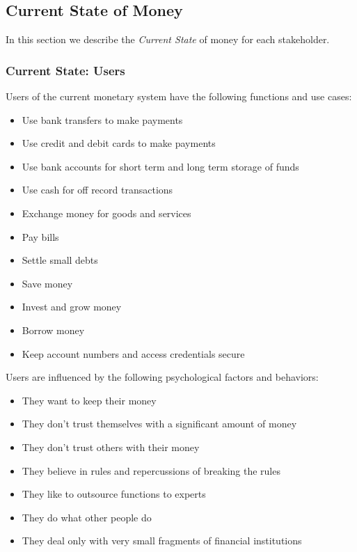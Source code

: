 \documentclass[a4paper,12pt]{article} %
\begin{document}
{\subsection{Current State of Money} \label{ssec:4.3}

In this section we describe the \textit{Current State} of money for each stakeholder.

\subsubsection{Current State: Users} \label{sssec:4.3:users}

Users of the current monetary system have the following functions and use cases:

\begin{itemize}
	\item Use bank transfers to make payments
	\item Use credit and debit cards to make payments
	\item Use bank accounts for short term and long term storage of funds
	\item Use cash for off record transactions
	\item Exchange money for goods and services
	\item Pay bills
	\item Settle small debts
	\item Save money
	\item Invest and grow money
	\item Borrow money
	\item Keep account numbers and access credentials secure
\end{itemize}

Users are influenced by the following psychological factors and behaviors:

\begin{itemize}
	\item They want to keep their money
	\item They don't trust themselves with a significant amount of money
	\item They don't trust others with their money
	\item They believe in rules and repercussions of breaking the rules
	\item They like to outsource functions to experts
	\item They do what other people do
	\item They deal only with very small fragments of financial institutions
\end{itemize}

}
\end{document}
